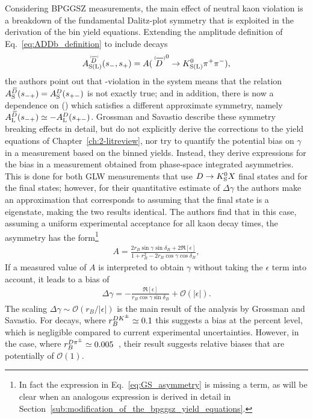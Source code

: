 Considering BPGGSZ measurements, the main effect of neutral kaon \CP violation is a breakdown of the fundamental Dalitz-plot symmetry that is exploited in the derivation of the bin yield equations. Extending the amplitude definition of Eq.~\eqref{eq:ADDb_definition} to include \KL decays
\begin{align}\label{eq:ADDb_definition_with_KL}
\ADorDbSL (\smpLong)= A(\DorDbar^0\to K^0_\text{S(L)} \pi^+\pi^-),
\end{align}
the authors point out that \CP-violation in the \KS system means that the relation $A_{\rm S}^{{\kern 0.18em\overline{\kern -0.18em D}}}(s_{-+})=A_{\rm S}^{D}(s_{+-})$ is not exactly true; and in addition, there is now a dependence on \ADL(\smp) which satisfies a different approximate symmetry, namely ${A_{\rm L}^{{\kern 0.18em\overline{\kern -0.18em D}}}(s_{-+}) \simeq -A_{\rm L}^{D}(s_{+-})}$. Grossman and Savastio describe these symmetry breaking effects in detail, but do not explicitly derive the corrections to the yield equations of Chapter~\ref{ch:2-litreview}, nor try to quantify the potential bias on $\gamma$ in a measurement based on the binned yields. Instead, they derive expressions for the bias in a measurement obtained from phase-space integrated \CP asymmetries. This is done for both GLW measurements that use ${D}\rightarrow{\ensuremath{{K}^0_{\mathrm{S}}}} X$ final states and for the \DtoKshh final states; however, for their quantitative estimate of $\Delta \gamma$ the authors make an approximation that corresponds to assuming that the \DtoKshh final state is a \CP eigenstate, making the two results identical. The authors find that in this case, assuming a uniform experimental acceptance for all kaon decay times, the asymmetry has the form\footnote{In fact the expression in Eq.~\eqref{eq:GS_asymmetry} is missing a term, as will be clear when an analogous expression is derived in detail in Section~\ref{sub:modification_of_the_bpggsz_yield_equations}.}
\begin{align}\label{eq:GS_asymmetry}
    A = \frac{2r_B\sin \gamma \sin \delta_B + 2 \Re [\epsilon]}{1+r_B^2-2r_B\cos \gamma \cos \delta_B},
\end{align}
If a measured value of $A$ is interpreted to obtain $\gamma$ without taking the $\epsilon$ term into account, it leads to a bias of
\begin{align}
    \Delta \gamma = -\frac{\Re [\epsilon]}{r_B \cos \gamma \sin \delta_B} + \mathcal O(|\epsilon|).
\end{align}
The scaling $\Delta\gamma\sim\mathcal O(r_B/|\epsilon|)$ is the main result of the analysis by Grossman and Savastio. For \BtoDK decays, where $r_B^{{{D}{{K}^\pm}}}\simeq 0.1$ this suggests a bias at the percent level, which is negligible compared to current experimental uncertainties. However, in the \BtoDpi case, where $r_B^{D\pi^\pm}\simeq 0.005$~\cite{rDpi}, their result suggests relative biases that are potentially of $\mathcal O (1)$.



